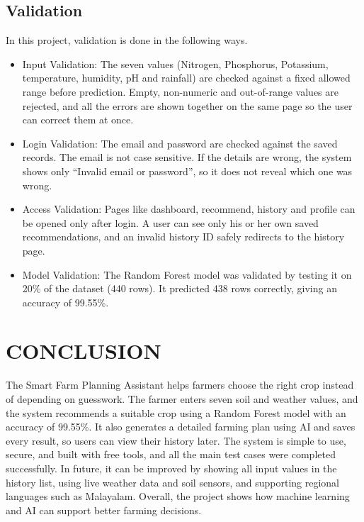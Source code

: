 \section{Validation}
In this project, validation is done in the following ways.
\begin{itemize}
\item Input Validation: The seven values (Nitrogen, Phosphorus, Potassium, temperature, humidity, pH and rainfall) are checked against a fixed allowed range before prediction. Empty, non-numeric and out-of-range values are rejected, and all the errors are shown together on the same page so the user can correct them at once.

\item Login Validation: The email and password are checked against the saved records. The email is not case sensitive. If the details are wrong, the system shows only “Invalid email or password”, so it does not reveal which one was wrong.

\item Access Validation: Pages like dashboard, recommend, history and profile can be opened only after login. A user can see only his or her own saved recommendations, and an invalid history ID safely redirects to the history page.

\item Model Validation: The Random Forest model was validated by testing it on 20\% of the dataset (440 rows). It predicted 438 rows correctly, giving an accuracy of 99.55\%.
\end{itemize}
%
%
\chapter{CONCLUSION}
The Smart Farm Planning Assistant helps farmers choose the right crop instead of depending on guesswork. The farmer enters seven soil and weather values, and the system recommends a suitable crop using a Random Forest model with an accuracy of 99.55\%. It also generates a detailed farming plan using AI and saves every result, so users can view their history later. The system is simple to use, secure, and built with free tools, and all the main test cases were completed successfully. In future, it can be improved by showing all input values in the history list, using live weather data and soil sensors, and supporting regional languages such as Malayalam. Overall, the project shows how machine learning and AI can support better farming decisions.
%
%
